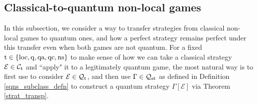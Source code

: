 \documentclass[11pt]{amsart}
\newcommand{\cl}[1]{\mathcal{#1}}
\begin{document}
\subsection{Classical-to-quantum non-local games}

In this subsection, we consider a way to transfer strategies from classical non-local games to quantum ones, and how a perfect strategy remains perfect under this transfer even when both games are not quantum. For a fixed ${\rm t} \in \{\rm loc, q, qa, qc, ns\}$ to make sense of how we can take a classical strategy $\cl{E} \in \cl{C}_{\rm t}$ and ``apply" it to a legitimately quantum game, the most natural way is to first use \cite[Remark 8.1]{tt} to consider $\cl{E} \in \cl{Q}_{\rm t}$, and then use $\Gamma \in \cl{Q}_{\rm st}$ as defined in Definition \ref{sqns_subclass_defn} to construct a quantum strategy $\Gamma[\cl{E}]$ via Theorem \ref{strat_transp}.

\end{document}
